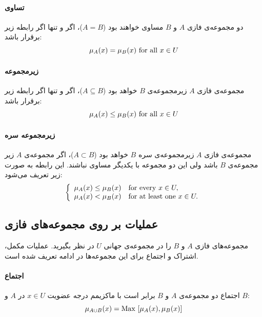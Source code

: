 \documentclass[12pt,a4paper]{article}
\theoremstyle{definition}
\begin{document}
 \paragraph{تساوی}
دو مجموعه‌ی فازی $A$ و $B$ مساوی خواهند بود ($A=B$)، اگر و تنها اگر رابطه زیر برقرار باشد:
\begin{equation}\label{eq:e_fset_rel_eq}
 \mu_{A}(x) = \mu_{B}(x)\  {\rm for\ all}\ x\in U
\end{equation}
\paragraph{زیرمجموعه}
مجموعه‌ی فازی $A$ زیرمجموعه‌ی $B$ خواهد بود ($A \subseteq B$)، اگر و تنها اگر رابطه زیر برقرار باشد:
\begin{equation}\label{eq:e_fset_rel_subseteq}
\mu_{A}(x) \le \mu_{B}(x)\  {\rm for\ all}\ x\in U
\end{equation}
\paragraph{زیرمجموعه سره}
مجموعه‌ی فازی $A$ زیرمجموعه‌ی سره $B$ خواهد بود ($A \subset B$)، اگر مجموعه‌ی $A$ زیر مجموعه‌ی $B$ باشد ولی این دو مجموعه با یکدیگر مساوی نباشند. این رابطه به صورت زیر تعریف می‌شود:
\begin{equation}\label{eq:e_fset_rel_subset}
\left\{ \begin{array}{ll} 
\mu_{A}(x) \le \mu_{B}(x) &    {\rm for\ every}\ x \in U, \\
\mu_{A}(x) < \mu_{B}(x) &  {\rm for\ at\ least\ one}\ x \in U.
\end{array} \right.
\end{equation}
 \subsection{عملیات بر روی مجموعه‌های فازی}
 مجموعه‌های فازی $A$ و $B$ را در مجموعه‌ی جهانی $U$ در نظر بگیرید. عملیات مکمل، اشتراک و اجتماع برای این مجموعه‌ها در ادامه تعریف شده است.
\paragraph{اجتماع}
 اجتماع دو مجموعه‌ی $A$ و $B$ برابر است با ماکزیمم درجه عضویت $x \in U$ در $A$ و $B$:
 \begin{equation}\label{eq:e_fset_op_union}
 \mu_{A \cup B}(x) = {\rm Max}\ [\mu_{A}(x), \mu_{B}(x)]
 \end{equation}
\end{document}

